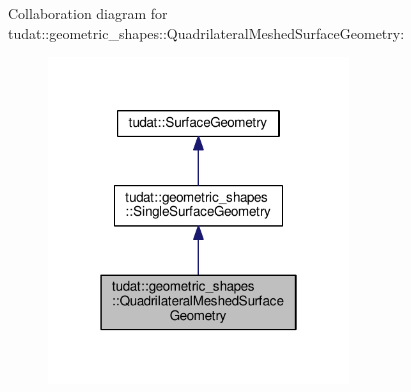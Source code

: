 Collaboration diagram for tudat\+:\+:geometric\+\_\+shapes\+:\+:Quadrilateral\+Meshed\+Surface\+Geometry\+:
\nopagebreak
\begin{figure}[H]
\begin{center}
\leavevmode
\includegraphics[width=226pt]{classtudat_1_1geometric__shapes_1_1QuadrilateralMeshedSurfaceGeometry__coll__graph}
\end{center}
\end{figure}
